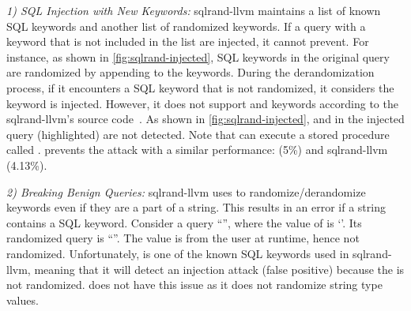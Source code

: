 {{\it 1) SQL Injection with New Keywords:} 
sqlrand-llvm maintains a list of known SQL keywords and another list of randomized keywords. 
If a query with a keyword that is not included in the list are injected, it cannot prevent.
For instance, as shown in \autoref{fig:sqlrand-injected}, SQL keywords in the original query are randomized by appending  to the keywords.
During the derandomization process, if it encounters a SQL keyword that is not randomized, it considers the keyword is injected. 
However, it does not support  and  keywords according to the sqlrand-llvm's source code~\cite{sqlrand-llvm}.
As shown in \autoref{fig:sqlrand-injected},  and  in the injected query (highlighted) are not detected.
Note that  can execute a stored procedure called .
%
\sysname prevents the attack with a similar performance: \sysname (5\%) and sqlrand-llvm (4.13\%).


{\it 2) Breaking Benign Queries:} 
sqlrand-llvm uses  to randomize/derandomize keywords even if they are a part of a string.
This results in an error if a string contains a SQL keyword. 
Consider a query ``'', where the value of  is `'. Its randomized query is ``''. 
The value  is from the user at runtime, hence not randomized. Unfortunately,  is one of the known SQL keywords used in sqlrand-llvm, meaning that it will detect an injection attack (false positive) because the  is not randomized.
\sysname does not have this issue as it does not randomize string type values.
}


